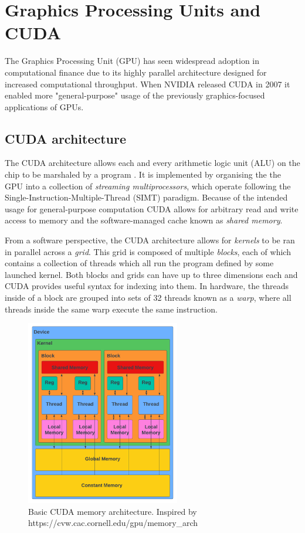 \section{Graphics Processing Units and CUDA}
The Graphics Processing Unit (GPU) has seen widespread adoption in computational finance due to its highly parallel architecture designed for increased computational throughput. When NVIDIA released CUDA \cite{cudazone} in 2007 it enabled more "general-purpose" usage of the previously graphics-focused applications of GPUs.

\subsection{CUDA architecture} \label{sec:cudaarch}
The CUDA architecture allows each and every arithmetic logic unit (ALU) on the chip to be marshaled by a program \cite{sanders2010cuda}. It is implemented by organising the the GPU into a collection of \textit{streaming multiprocessors}, which operate following the Single-Instruction-Multiple-Thread (SIMT) paradigm. Because of the intended usage for general-purpose computation CUDA allows for arbitrary read and write access to memory and the software-managed cache known as \textit{shared memory}.

From a software perspective, the CUDA architecture allows for \textit{kernels} to be ran in parallel across a \textit{grid}. This grid is composed of multiple \textit{blocks}, each of which contains a collection of threads which all run the program defined by some launched kernel. Both blocks and grids can have up to three dimensions each and CUDA provides useful syntax for indexing into them. In hardware, the threads inside of a block are grouped into sets of 32 threads known as a \textit{warp}, where all threads inside the same warp execute the same instruction.

\begin{figure}[h]
    \centering
    \includegraphics[width=0.6\textwidth]{figures/cuda arch.pdf}
    \caption{Basic CUDA memory architecture. Inspired by https://cvw.cac.cornell.edu/gpu/memory\_arch}
    \label{fig:cudaarch}
\end{figure}

